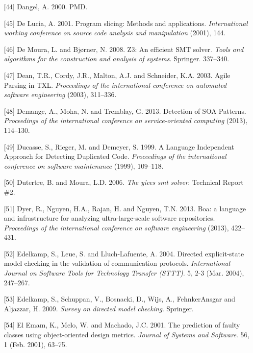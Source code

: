 \documentclass[12pt]{report}
\begin{document}
\hypertarget{ref-Dangel2000}{}
{[}44{]} Dangel, A. 2000. PMD.

\hypertarget{ref-de2001program}{}
{[}45{]} De Lucia, A. 2001. Program slicing: Methods and applications.
\emph{International working conference on source code analysis and
manipulation} (2001), 144.

\hypertarget{ref-de2008z3}{}
{[}46{]} De Moura, L. and Bjørner, N. 2008. Z3: An efficient SMT solver.
\emph{Tools and algorithms for the construction and analysis of
systems}. Springer. 337--340.

\hypertarget{ref-Dean}{}
{[}47{]} Dean, T.R., Cordy, J.R., Malton, A.J. and Schneider, K.A. 2003.
Agile Parsing in TXL. \emph{Proceedings of the international conference
on automated software engineering} (2003), 311--336.

\hypertarget{ref-demange2013}{}
{[}48{]} Demange, A., Moha, N. and Tremblay, G. 2013. Detection of SOA
Patterns. \emph{Proceedings of the international conference on
service-oriented computing} (2013), 114--130.

\hypertarget{ref-StephaneDucasse}{}
{[}49{]} Ducasse, S., Rieger, M. and Demeyer, S. 1999. A Language
Independent Approach for Detecting Duplicated Code. \emph{Proceedings of
the international conference on software maintenance} (1999), 109--118.

\hypertarget{ref-Dutertre2006}{}
{[}50{]} Dutertre, B. and Moura, L.D. 2006. \emph{The yices smt solver}.
Technical Report \#2.

\hypertarget{ref-Dyer2013}{}
{[}51{]} Dyer, R., Nguyen, H.A., Rajan, H. and Nguyen, T.N. 2013. Boa: a
language and infrastructure for analyzing ultra-large-scale software
repositories. \emph{Proceedings of the international conference on
software engineering} (2013), 422--431.

\hypertarget{ref-Edelkamp2004}{}
{[}52{]} Edelkamp, S., Leue, S. and Lluch-Lafuente, A. 2004. Directed
explicit-state model checking in the validation of communication
protocols. \emph{International Journal on Software Tools for Technology
Transfer (STTT)}. 5, 2-3 (Mar. 2004), 247--267.

\hypertarget{ref-Edelkamp2009}{}
{[}53{]} Edelkamp, S., Schuppan, V., Bosnacki, D., Wijs, A.,
FehnkerAnsgar and Aljazzar, H. 2009. \emph{Survey on directed model
checking}. Springer.

\hypertarget{ref-ElEmam2001}{}
{[}54{]} El Emam, K., Melo, W. and Machado, J.C. 2001. The prediction of
faulty classes using object-oriented design metrics. \emph{Journal of
Systems and Software}. 56, 1 (Feb. 2001), 63--75.
\end{document}
